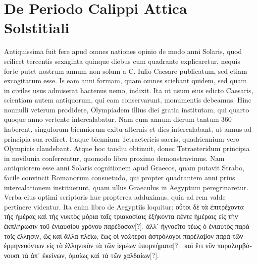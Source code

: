\section{De Periodo Calippi Attica Solstitiali}
%
Antiquissima fuit fere apud omnes nationes opinio de modo
anni Solaris, quod scilicet tercentis sexaginta quinque diebus
cum quadrante explicaretur, nequis forte putet nostrum annum
non solum a C. %
 Iulio Caesare publicatum, sed etiam excogitatum esse.
Is eam anni formam, quam omnes sciebant quidem, sed quam in civiles
usus admiserat hactenus nemo, indixit.
Ita ut usum eius edicto Caesaris,
scientiam autem antiquorum, qui eam conservarunt, monumentis
debeamus.
Hinc nonnulli veterum prodidere, Olympiadem illius
diei gratia institutam, qui quarto quoque anno vertente intercalabatur.
Nam cum annum dierum tantum 360 haberent, singulorum bienniorum
exitu alternis  et  dies intercalabant, ut annus ad principia
sua rediret.
Itaque biennium Tetraetericis sacris, quadriennium vero
Olympicis claudebant.
Atque hoc tandiu obtinuit, donec Tetraeteridum
principia in novilunia conferrentur, quomodo libro proximo
demonstravimus.
%
Nam antiquiorem esse anni Solaris cognitionem
apud Graecos, quam putavit Strabo, facile convincit Romanorum
consuetudo, qui propter quadrantem anni prius intercalationem
instituerunt, quam ullus Graeculus in Aegyptum peregrinaretur.
Verba
eius optimi scriptoris huc propterea adduximus, quia ad rem valde
pertinere videntur.
Ita enim libro  de Aegyptiis loquitur:
 \textgreek{οὗτοι δὲ
τὰ ἐπιτρέχοντα τὴς ἡμέρας καὶ τὴς νυκτὸς μόρια ταῖς τριακοσίαις ἑξήκοντα πέντε
ἡμέραις εἰς τὴν ἐκπλήρωσιν τοῦ ἐνιαυσίου χρόνου παρέδοσαν[?]}.
\textgreek{ἀλλ᾽ ἠγνοεῖτο τέως
ὁ ἐνιαυτὸς παρὰ τοῖς ἕλλησιν, ῶς καὶ ἄλλα πλείω, ἕως οἱ νεώτεροι ἀστρόλογοι
παρέλαβον παρὰ τῶν ἑρμηνευόντων εἰς τὸ ἑλληνικὸν τὰ τῶν ἱερέων ὑπομνήματα[?]}.
\textgreek{καὶ ἔτι νῦν παραλαμβάνουσι τὰ ἀπ᾽ ἐκείνων,
 ὁμοίως καὶ τὰ τῶν χαλδαίων[?]}.
